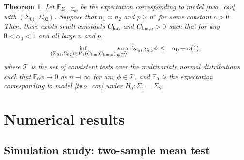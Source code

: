 \documentclass[11pt]{article}
\newtheorem{theorem}{Theorem}[section]
\newcommand{\bea}{\begin{eqnarray*}}
\newcommand{\eea}{\end{eqnarray*}}
\newcommand{\sg}{\Sigma}
\newcommand{\lra}{\longrightarrow}
\newcommand{\calT}{\mathcal{T}}
\newcommand{\bbE}{\mathbb{E}}
\begin{document}
\begin{theorem}\label{thm:two_cov_lowerbound}
	Let $\bbE_{\sg_{01},\sg_{02}}$ be the expectation corresponding to model \eqref{two_cov} with $(\sg_{01},\sg_{02})$.
	Suppose that $n_1\asymp n_2$ and $p \ge n^c$ for some constant $c>0$.
	Then, there exists small constants $C_{\rm bm}$ and $C_{{\rm bm},a} >0$ such that for any $0<\alpha_0<1$ and all large $n$ and $p$,
	\bea
	\inf_{(\sg_{01},\sg_{02}) \in {H}_1(C_{\rm bm}, C_{{\rm bm},a})} \sup_{\phi \in \calT} \bbE_{\sg_{01},\sg_{02}} \phi &\le& {\alpha_0} + o(1),
	\eea
	where $\calT$ is the set of consistent tests over the multivariate normal distributions such that $\bbE_{0} \phi \lra 0$ as $n\to\infty$ for any $\phi \in \calT$, and $\bbE_0$ is the expectation corresponding to model \eqref{two_cov} under $H_0:\sg_1=\sg_2$.
\end{theorem}

\section{Numerical results}\label{sec:numerical}
\subsection{Simulation study: two-sample mean test}\label{subsec:sim_mean}
\end{document}
